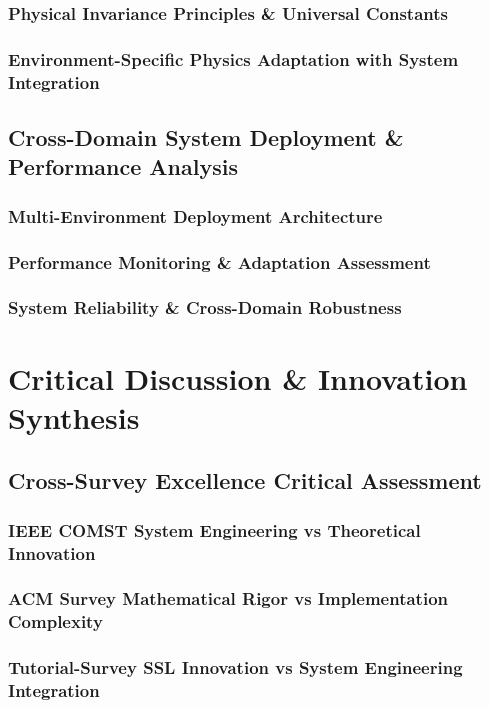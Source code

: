 \documentclass[journal]{IEEEtran}
\begin{document}
\subsubsection{Physical Invariance Principles \& Universal Constants}
\subsubsection{Environment-Specific Physics Adaptation with System Integration}

\subsection{Cross-Domain System Deployment \& Performance Analysis}
\subsubsection{Multi-Environment Deployment Architecture}
\subsubsection{Performance Monitoring \& Adaptation Assessment}
\subsubsection{System Reliability \& Cross-Domain Robustness}

\section{Critical Discussion \& Innovation Synthesis}
\label{sec:discussion}

\subsection{Cross-Survey Excellence Critical Assessment}
\subsubsection{IEEE COMST System Engineering vs Theoretical Innovation}
\subsubsection{ACM Survey Mathematical Rigor vs Implementation Complexity}
\subsubsection{Tutorial-Survey SSL Innovation vs System Engineering Integration}
\end{document}
